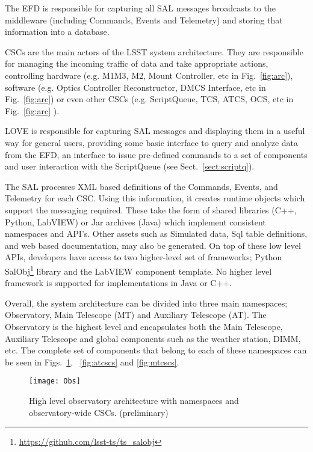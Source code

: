 The EFD is responsible for capturing all SAL messages broadcasts to the middleware (including Commands, Events and Telemetry) and storing that information into a database.

CSCs are the main actors of the LSST system architecture. They are responsible for managing the incoming traffic of data and take 
appropriate actions, controlling hardware (e.g. M1M3, M2, Mount Controller, etc in Fig.~\ref{fig:arc}), software (e.g. Optics Controller 
Reconstructor, DMCS Interface, etc in Fig.~\ref{fig:arc}) or even other CSCs (e.g. ScriptQueue, TCS, ATCS, OCS, etc in 
Fig.~\ref{fig:arc} ).

LOVE is responsible for capturing SAL messages and displaying them in a useful way for general users, providing some basic interface to 
query and analyze data from the EFD, an interface to issue pre-defined commands to a set of components and user interaction with the 
ScriptQueue (see Sect.~\ref{sect:scriptq}).

The SAL processes XML based definitions of the Commands, Events, and Telemetry for each CSC. Using this information, it creates 
runtime objects which support the messaging required. These take the form of shared libraries (C++, Python, LabVIEW) or Jar archives 
(Java) which implement consistent namespaces and API's. Other assets such as Simulated data, Sql table definitions, and web based 
documentation, may also be generated. On top of these low level APIs, developers have access to two higher-level set of frameworks; 
Python SalObj\footnote{\url{https://github.com/lsst-ts/ts_salobj}} library and the LabVIEW component template. No higher level framework 
is supported for implementations in Java or C++.

Overall, the system architecture can be divided into three main namespaces; Observatory, Main Telescope (MT) and Auxiliary Telescope 
(AT). The Observatory is the highest level and encapsulates both the Main Telescope, Auxiliary Telescope and global components such
as the weather station, DIMM, etc. The complete set of components that belong to each of these namespaces can be seen in
Figs.~\ref{fig:ocs}, ~\ref{fig:atcscs} and \ref{fig:mtcscs}.

\begin{figure}
\begin{center}
\texttt{[image: Obs]}
\caption{High level observatory architecture with namespaces and observatory-wide CSCs. (preliminary)\label{fig:ocs}}
\end{center}
\end{figure}


